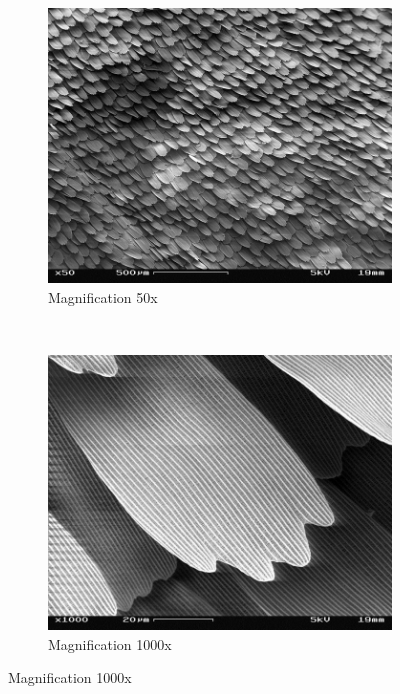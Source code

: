 \begin{figure}[h]
	\centering
	\begin{subfigure}[b]{0.3\textwidth}
		\includegraphics[width=\textwidth]{chapter_1/butterfly}
		\caption{Magnification 50x}
		\label{fig:b50}
	\end{subfigure}
	~ %
	\begin{subfigure}[b]{0.3\textwidth}
		\includegraphics[width=\textwidth]{chapter_1/butterfly2}
		\caption{Magnification 1000x}
		\label{fig:b1000}

\end{subfigure}
\end{figure}
